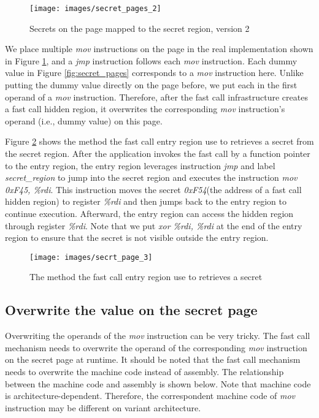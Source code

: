  \begin{figure}[tbp]
   \centering
   \texttt{[image: images/secret\_pages\_2]}
   \caption[Short description]{Secrets on the page mapped to the secret region, version 2}
    \label{fig:secret_pages_2}
 \end{figure}
  
 We place multiple \emph{mov} instructions on the page in the real implementation shown in Figure \ref{fig:secret_pages_2},
 and a \emph{jmp} instruction follows each \emph{mov} instruction. Each dummy value in 
 Figure \ref{fig:secret_pages} corresponds to a \emph{mov} instruction here. Unlike putting the 
 dummy value directly on the page before, we put each in the first operand of
  a \emph{mov} instruction. Therefore, after the fast call infrastructure creates a fast 
  call hidden region, it overwrites the corresponding \emph{mov} instruction's 
  operand (i.e., dummy value) on this page.  


  Figure \ref{fig:secrt_page_3}  shows the method the fast call entry region use to retrieves a 
  secret from the secret region. After the application invokes the 
  fast call by a function pointer to the entry region, the entry region 
  leverages instruction \emph{jmp} and label \emph{secret\_region} to jump into the 
  secret region and executes the instruction \emph{mov 0xF45, \%rdi}. This 
  instruction moves the secret \emph{0xF54}(the address of a fast call hidden region) 
  to register \emph{\%rdi} and then jumps back to the entry region to continue execution. 
  Afterward, the entry region can access the hidden region through register \emph{\%rdi}.
  Note that we put  \emph{xor \%rdi, \%rdi} at the end of the entry region to ensure that the secret is not visible outside the entry region. 

  \begin{figure}[H]
    \centering
    \texttt{[image: images/secrt\_page\_3]}
    \caption[Short description]{The method the fast call entry region use to retrieves a 
    secret}
     \label{fig:secrt_page_3}
  \end{figure}

  \subsection{Overwrite the value on the secret page}

  Overwriting the operands of the \emph{mov} instruction can be very tricky. 
  The fast call mechanism needs to overwrite the operand of the corresponding 
  \emph{mov} instruction on the secret page at runtime. It should be noted that 
  the fast call mechanism needs to overwrite the machine code instead of 
  assembly. The relationship between the machine code and assembly is 
  shown below. Note that machine code is architecture-dependent. Therefore, the correspondent 
  machine code of \emph{mov} instruction may be different on variant architecture.
   

